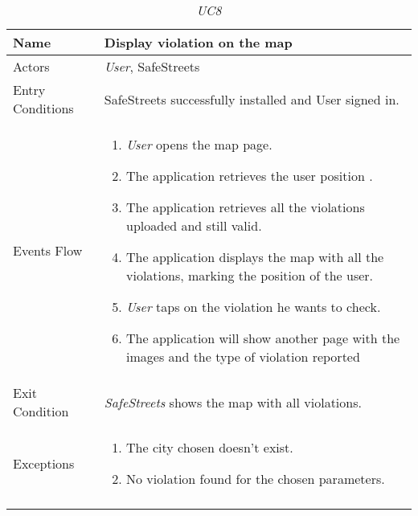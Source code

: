 \documentclass[../../../RASD.tex]{subfiles}
\begin{document}
    \begin{center}
        \begin{longtable}{| p{.35\linewidth} | p{.65\linewidth} |}
            \hline
            \textbf{Name} & \textbf{Display violation on the map}\\ \hline
            Actors & \textit{User}, SafeStreets\\ \hline
            Entry Conditions & SafeStreets successfully installed and User signed in.\\ \hline
            Events Flow &
            \begin{enumerate}
                \item \textit{User} opens the map page.
                \item  The application retrieves the user position .
                \item  The application retrieves all the violations uploaded and still valid.
                \item  The application displays the map with all the violations, marking the position of the user.
                \item \textit{User} taps on the violation he wants to check.
                \item The application will show another page with the images and the type of violation reported
            \end{enumerate}
            \\ \hline
            Exit Condition & \textit{SafeStreets} shows the map with all violations.\\ \hline
            Exceptions &
            \begin{enumerate}
                \item The city chosen doesn’t exist.
                \item No violation found for the chosen parameters.
            \end{enumerate}
            \\
            \hline
            \caption[\textit{Use Case 8}]{\textit{UC8}}
        \end{longtable}
    \end{center}
    \newpage
\end{document}
